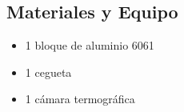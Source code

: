 \subsection{Materiales y Equipo}
\begin{multicols}{2}
\begin{itemize}
 \item 1 bloque de aluminio 6061
 \item 1 cegueta
 \item 1 c\'amara termogr\'afica
\end{itemize}
\end{multicols}
